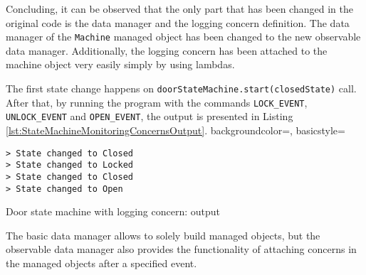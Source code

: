 



Concluding, it can be observed that the only part that has been changed in the original code is the data manager and the logging concern definition.
The data manager of the \texttt{Machine} managed object has been changed to the new observable data manager.
Additionally, the logging concern has been attached to the machine object very easily simply by using lambdas.

The first state change happens on \texttt{doorStateMachine.start(closedState)} call.
After that, by running the program with the commands \texttt{LOCK\_EVENT}, \texttt{UNLOCK\_EVENT} and \texttt{OPEN\_EVENT}, the output is presented in Listing \ref{lst:StateMachineMonitoringConcernsOutput}.
 {
    backgroundcolor=\color{white},
    basicstyle=\scriptsize\color{black}\ttfamily
}

\begin{sourcecode} [H]
	\lstset{numbers=none}
	\begin{lstlisting}[style=Bash]
> State changed to Closed
> State changed to Locked
> State changed to Closed
> State changed to Open
	\end{lstlisting}
	\caption{Door state machine with logging concern: output}
	\label{lst:StateMachineMonitoringConcernsOutput}
\end{sourcecode}

The basic data manager allows to solely build managed objects, but the observable data manager also provides the functionality of attaching concerns in the managed objects after a specified event.

